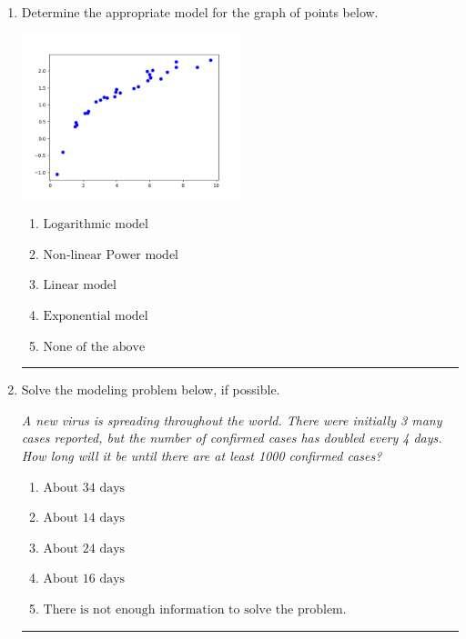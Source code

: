 \documentclass[14pt]{extbook}
\newcommand{\litem}[1]{\item#1\hspace*{-1cm}\rule{\textwidth}{0.4pt}}
\begin{document}
\begin{enumerate}
{\begin{enumerate}[label=\Alph*.]
\end{enumerate} }
\litem{
Determine the appropriate model for the graph of points below.
\begin{center}
    \includegraphics[width=0.5\textwidth]{../Figures/identifyModelGraph12CopyC.png}
\end{center}
\begin{enumerate}[label=\Alph*.]
\item \( \text{Logarithmic model} \)
\item \( \text{Non-linear Power model} \)
\item \( \text{Linear model} \)
\item \( \text{Exponential model} \)
\item \( \text{None of the above} \)

\end{enumerate} }
\litem{
Solve the modeling problem below, if possible.
\begin{center}
    \textit{ A new virus is spreading throughout the world. There were initially 3 many cases reported, but the number of confirmed cases has doubled every 4 days. How long will it be until there are at least 1000 confirmed cases? }
\end{center}
\begin{enumerate}[label=\Alph*.]
\item \( \text{About } 34 \text{ days} \)
\item \( \text{About } 14 \text{ days} \)
\item \( \text{About } 24 \text{ days} \)
\item \( \text{About } 16 \text{ days} \)
\item \( \text{There is not enough information to solve the problem.} \)


\end{enumerate}}
\end{enumerate}
\end{document}
